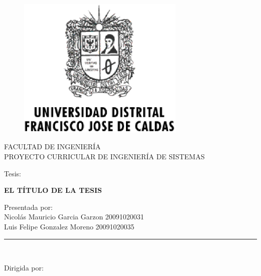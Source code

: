 \documentclass[letter,12pt]{book}
\begin{document}
  \begin{titlepage}

    \begin{center}
      \vspace*{-1in}
      \begin{figure}[htb]
    \begin{center}
      \includegraphics[width=8cm]{imagenes/Logo_Distrital.eps}
    \end{center}
    \end{figure}

    FACULTAD DE INGENIERÍA\\
    \vspace*{0.15in}
    PROYECTO CURRICULAR DE INGENIERÍA DE SISTEMAS \\
    \vspace*{0.6in}
    \begin{large}
    Tesis:\\
    \end{large}
    \vspace*{0.2in}
    \begin{Large}
    \textbf{EL TÍTULO DE LA TESIS} \\
    \end{Large}
    \vspace*{0.3in}
    \begin{large}
    Presentada por:\\
      Nicolás Mauricio Garcia Garzon 20091020031 \\
      Luis Felipe Gonzalez Moreno 20091020035
    \end{large}
    \vspace*{0.3in}
    \rule{80mm}{0.1mm}\\
    \vspace*{0.1in}
    \begin{large}
    Dirigida por: \\
    \end{large}
    \end{center}

    \end{titlepage}
\end{document}
